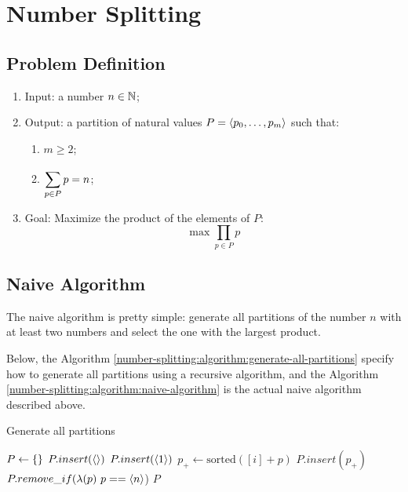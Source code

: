 \chapter{Number Splitting}

\newcommand{\Product}[2]{\prod\limits_{#1} #2}
\newcommand{\Floor}[1]{\left\lfloor #1 \right\rfloor}

\section{Problem Definition}

\begin{enumerate}
    \item Input: a number $n \in \mathbb{N}$;
    \item Output: a partition of natural values $P = \left\langle p_{0}, \dots, p_{m} \right\rangle$ such that:
    \begin{enumerate}
        \item $m \geqslant 2$;
        \item $\displaystyle\sum\limits_{p \in P}^{} p = n$;
    \end{enumerate}
    \item Goal: Maximize the product of the elements of $P$:
    \begin{equation}
        \max \Product{p \in P}{p}
    \end{equation}
\end{enumerate}

\section{Naive Algorithm}

The naive algorithm is pretty simple: generate all partitions of the number $n$ with at least two numbers and select the one with the largest product.

Below, the Algorithm \ref{number-splitting:algorithm:generate-all-partitions} specify how to generate all partitions using a recursive algorithm, and the Algorithm \ref{number-splitting:algorithm:naive-algorithm} is the actual naive algorithm described above.

\begin{algorithm}[H]
    \caption{Generate all partitions}
    \label{number-splitting:algorithm:generate-all-partitions}
    \begin{algorithmic}[1]
            \State $P \gets \left\{  \right\}$
                \State $P.insert(\left\langle  \right\rangle)$
                \State $P.insert(\left\langle 1 \right\rangle)$
            \EndIf
                    \State $p_+ \gets \text{sorted}([i] + p)$
                    \State $P.insert(p_+)$
                \EndFor
            \EndFor
                \State $P.remove\_if(\lambda(p) \ p == \left\langle n \right\rangle$)
            \EndIf
            \State \Return $P$
        \EndFunction
        \end{algorithmic}
\end{algorithm}


